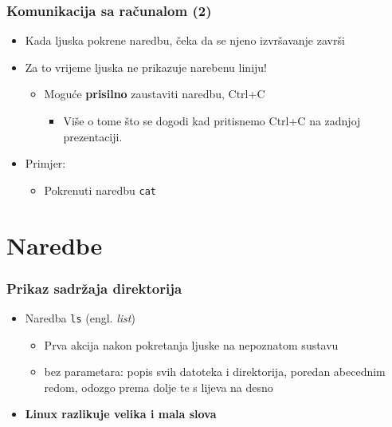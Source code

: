 \documentclass{beamer}
\newcommand{\shell}[1]{\texttt{#1}}
\begin{document}
\begin{frame}[t]
\frametitle{Komunikacija sa računalom (2)}
\begin{itemize}
  \item Kada ljuska pokrene naredbu, čeka da se njeno izvršavanje
        završi
  \item Za to vrijeme ljuska ne prikazuje narebenu liniju!
  \begin{itemize}
    \item Moguće \textbf{prisilno} zaustaviti naredbu, Ctrl+C
    \begin{itemize}
    	\item Više o tome što se dogodi kad pritisnemo Ctrl+C na zadnjoj prezentaciji.
    \end{itemize}
  \end{itemize}
  \item Primjer:
  \begin{itemize}
    \item Pokrenuti naredbu \shell{cat}
  \end{itemize}
\end{itemize}
\end{frame}

\section{Naredbe}
\begin{frame}[t]
\frametitle{Prikaz sadržaja direktorija}
\begin{itemize}
  \item Naredba \texttt {ls} (engl. \emph{list})
  \begin{itemize}
    \item Prva akcija nakon pokretanja ljuske na nepoznatom sustavu
    \item bez parametara: popis svih datoteka i direktorija, poredan
          abecednim redom, odozgo prema dolje te s lijeva na desno
  \end{itemize}
  \item \textbf {Linux razlikuje velika i mala slova}
\end{itemize}
\end{frame}
\end{document}
